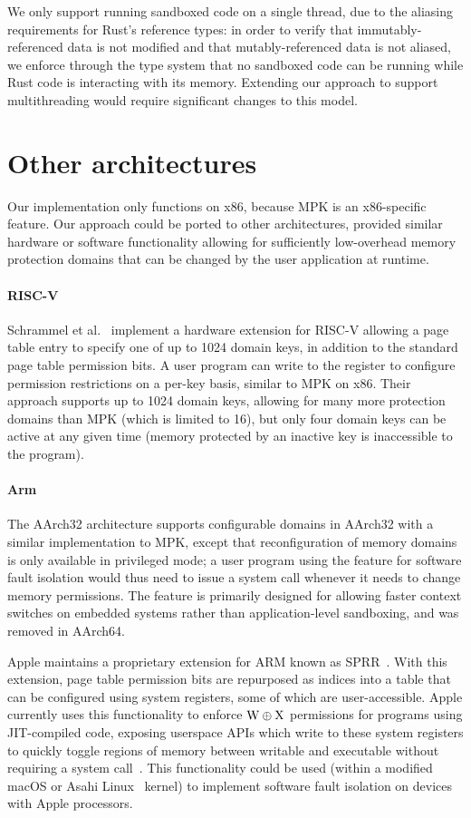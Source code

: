We only support running sandboxed code on a single thread, due to the aliasing requirements for
Rust's reference types: in order to verify that immutably-referenced data is not modified and that
mutably-referenced data is not aliased, we enforce through the type system that no sandboxed code
can be running while Rust code is interacting with its memory. Extending our approach to support
multithreading would require significant changes to this model.

\section{Other architectures}

Our implementation only functions on x86, because MPK is an x86-specific feature. Our approach could
be ported to other architectures, provided similar hardware or software functionality allowing for
sufficiently low-overhead memory protection domains that can be changed by the user application at
runtime.

\paragraph{RISC-V} Schrammel et al.~\cite{schrammel:donky} implement a hardware extension for RISC-V
allowing a page table entry to specify one of up to 1024 domain keys, in addition to the standard
page table permission bits. A user program can write to the  register to configure
permission restrictions on a per-key basis, similar to MPK on x86. Their approach supports up to
1024 domain keys, allowing for many more protection domains than MPK (which is limited to 16), but
only four domain keys can be active at any given time (memory protected by an inactive key is
inaccessible to the program).

\paragraph{Arm} The AArch32 architecture supports configurable domains in AArch32 with a similar
implementation to MPK, except that reconfiguration of memory domains is only available in privileged
mode; a user program using the feature for software fault isolation would thus need to issue a
system call whenever it needs to change memory permissions. The feature is primarily designed for
allowing faster context switches on embedded systems rather than application-level sandboxing, and
was removed in AArch64.

Apple maintains a proprietary extension for ARM known as SPRR~\cite{peter:sprr}. With this
extension, page table permission bits are repurposed as indices into a table that can be configured
using system registers, some of which are user-accessible. Apple currently uses this functionality
to enforce $\text W \oplus \text X$ permissions for programs using JIT-compiled code, exposing userspace APIs which
write to these system registers to quickly toggle regions of memory between writable and executable
without requiring a system call~\cite{apple:jit}. This functionality could be used (within a
modified macOS or Asahi Linux~\cite{asahi} kernel) to implement software fault isolation on devices
with Apple processors.
